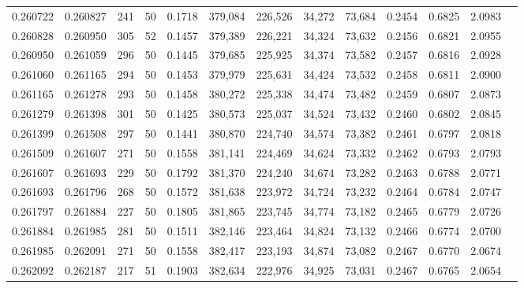 \begin{tabular}{rrrrrrrrrrrrr}
0.260722 & 0.260827 &   241 &  50 &                                     0.1718 & 379,084 & 226,526 &  34,272 &  73,684 & 0.2454 & 0.6825 & 2.0983 \\
0.260828 & 0.260950 &   305 &  52 &                                     0.1457 & 379,389 & 226,221 &  34,324 &  73,632 & 0.2456 & 0.6821 & 2.0955 \\
0.260950 & 0.261059 &   296 &  50 &                                     0.1445 & 379,685 & 225,925 &  34,374 &  73,582 & 0.2457 & 0.6816 & 2.0928 \\
0.261060 & 0.261165 &   294 &  50 &                                     0.1453 & 379,979 & 225,631 &  34,424 &  73,532 & 0.2458 & 0.6811 & 2.0900 \\
0.261165 & 0.261278 &   293 &  50 &                                     0.1458 & 380,272 & 225,338 &  34,474 &  73,482 & 0.2459 & 0.6807 & 2.0873 \\
0.261279 & 0.261398 &   301 &  50 &                                     0.1425 & 380,573 & 225,037 &  34,524 &  73,432 & 0.2460 & 0.6802 & 2.0845 \\
0.261399 & 0.261508 &   297 &  50 &                                     0.1441 & 380,870 & 224,740 &  34,574 &  73,382 & 0.2461 & 0.6797 & 2.0818 \\
0.261509 & 0.261607 &   271 &  50 &                                     0.1558 & 381,141 & 224,469 &  34,624 &  73,332 & 0.2462 & 0.6793 & 2.0793 \\
0.261607 & 0.261693 &   229 &  50 &                                     0.1792 & 381,370 & 224,240 &  34,674 &  73,282 & 0.2463 & 0.6788 & 2.0771 \\
0.261693 & 0.261796 &   268 &  50 &                                     0.1572 & 381,638 & 223,972 &  34,724 &  73,232 & 0.2464 & 0.6784 & 2.0747 \\
0.261797 & 0.261884 &   227 &  50 &                                     0.1805 & 381,865 & 223,745 &  34,774 &  73,182 & 0.2465 & 0.6779 & 2.0726 \\
0.261884 & 0.261985 &   281 &  50 &                                     0.1511 & 382,146 & 223,464 &  34,824 &  73,132 & 0.2466 & 0.6774 & 2.0700 \\
0.261985 & 0.262091 &   271 &  50 &                                     0.1558 & 382,417 & 223,193 &  34,874 &  73,082 & 0.2467 & 0.6770 & 2.0674 \\
0.262092 & 0.262187 &   217 &  51 &                                     0.1903 & 382,634 & 222,976 &  34,925 &  73,031 & 0.2467 & 0.6765 & 2.0654 \\

\end{tabular}
